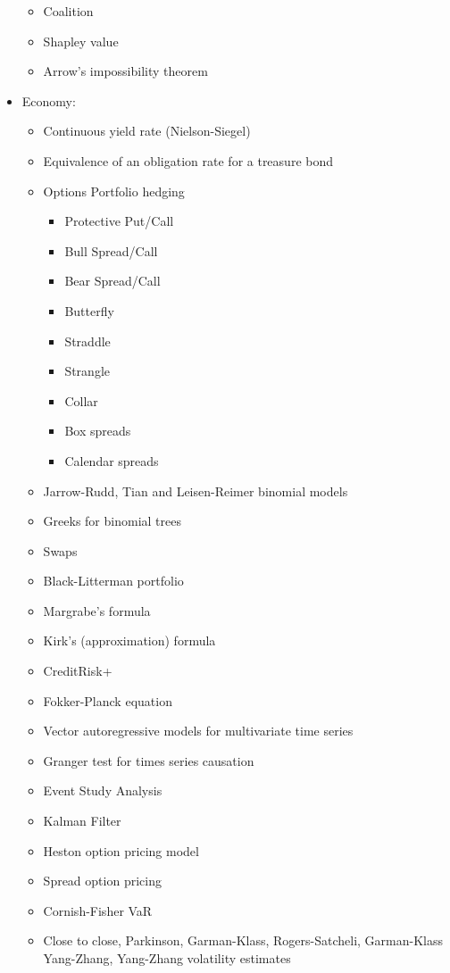 \begin{itemize}
\begin{itemize}
				\item Coalition
				\item Shapley value
				\item Arrow's impossibility theorem
			\end{itemize}
		\item Economy: 
			\begin{itemize}
				\item Continuous yield rate (Nielson-Siegel)
				\item Equivalence of an obligation rate for a treasure bond
				\item Options Portfolio hedging
				\begin{itemize}
					\item Protective Put/Call
					\item Bull Spread/Call
					\item Bear Spread/Call
					\item Butterfly
					\item Straddle
					\item Strangle
					\item Collar
					\item Box spreads
					\item Calendar spreads
				\end{itemize}
				\item Jarrow-Rudd, Tian and Leisen-Reimer binomial models
				\item Greeks for binomial trees
				\item Swaps
				\item Black-Litterman portfolio
				\item Margrabe's formula
				\item Kirk's (approximation) formula
				\item CreditRisk+
				\item Fokker-Planck equation
				\item Vector autoregressive models for multivariate time series
				\item Granger test for times series causation
				\item Event Study Analysis
				\item Kalman Filter
				\item Heston option pricing model
				\item Spread option pricing
				\item Cornish-Fisher VaR
				\item Close to close, Parkinson, Garman-Klass, Rogers-Satcheli, Garman-Klass Yang-Zhang, Yang-Zhang volatility estimates

\end{itemize}
\end{itemize}
